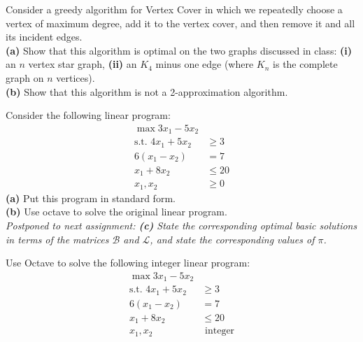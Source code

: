 \documentclass[fleqn]{homework}
\begin{document}
  \maketitle

  \begin{problem}{1}
    \begin{question}
      Consider a greedy algorithm for Vertex Cover in which we repeatedly choose
      a vertex of maximum degree, add it to the vertex cover, and then remove it
      and all its incident edges. \\
      \textbf{(a)} Show that this algorithm is optimal on the two graphs
      discussed in class: \textbf{(i)} an $n$ vertex star graph, \textbf{(ii)}
      an $K_4$ minus one edge (where $K_n$ is the complete graph on $n$ vertices).\\
      \textbf{(b)} Show that this algorithm is not a 2-approximation algorithm.
    \end{question}
  \end{problem}

  \begin{problem}{2}
    \begin{question}
      Consider the following linear program:
      \begin{align*}
        \max 3x_1 - 5x_2 & \\
        \text{s.t.  } 4x_1 + 5x_2 &\ge 3 \\
        6(x_1 - x_2) &= 7 \\
        x_1 + 8x_2 &\le 20 \\
        x_1, x_2 &\ge 0
      \end{align*}
      \textbf{(a)} Put this program in standard form.\\
      \textbf{(b)} Use octave to solve the original linear program.\\
      \textit{Postponed to next assignment: \textbf{(c)} State the corresponding
        optimal basic solutions in terms of the matrices $\mathcal{B}$ and
        $\mathcal{L}$, and state the corresponding values of $\pi$.}
    \end{question}
  \end{problem}

  \begin{problem}{3}
    \begin{question}
      Use Octave to solve the following integer linear program:
      \begin{align*}
        \max 3x_1 - 5x_2 & \\
        \text{s.t.  } 4x_1 + 5x_2 &\ge 3 \\
        6(x_1 - x_2) &= 7 \\
        x_1 + 8x_2 &\le 20 \\
        x_1, x_2 &\text{ integer}
      \end{align*}
    \end{question}
  \end{problem}
\end{document}
